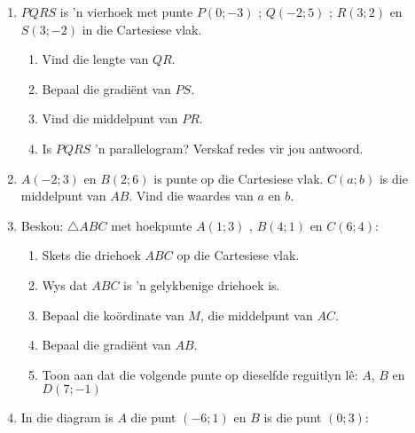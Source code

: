 \begin{eocexercises}{}
\begin{enumerate}[noitemsep, label=\textbf{\arabic*}. ]
\item $PQRS$ is ’n vierhoek met punte $P(0;-3)$ ; $Q(-2;5)$ ; $R(3;2)$ en $S(3;-2)$  in die Cartesiese vlak.
\begin{enumerate}[noitemsep, label=\textbf{(\alph*)} ]
\item Vind die lengte van $QR$.
\item Bepaal die gradiënt van $PS$.
\item Vind die middelpunt van $PR$.
\item Is $PQRS$  ’n parallelogram? Verskaf redes vir jou antwoord.
 \end{enumerate}
\item $A(-2;3)$ en $B(2;6)$ is punte op die Cartesiese vlak. $C(a;b)$ is die middelpunt van $AB$. Vind die waardes
van $a$ en $b$.
\item Beskou: $\triangle ABC$ met hoekpunte $A(1; 3)$ , $B(4;1)$ en $C (6; 4)$:
\begin{enumerate}[noitemsep, label=\textbf{(\alph*)} ]
\item Skets die driehoek $ABC$ op die Cartesiese vlak. 
\item Wys dat $ABC$ is ’n gelykbenige driehoek is.
\item Bepaal die koördinate van $M$, die middelpunt van $AC$.
\item Bepaal die gradiënt van $AB$.
\item Toon aan dat die volgende punte op dieselfde reguitlyn l\^e: $A$, $B$ en $D(7;-1)$
\end{enumerate}
\item In die diagram is $A$ die punt $(-6;1)$ en $B$ is die punt $(0;3)$:
    \setcounter{subfigure}{0}
    \begin{figure}[H] %
      \begin{center}
\end{center}
\end{figure}
\end{enumerate}
\end{eocexercises}
